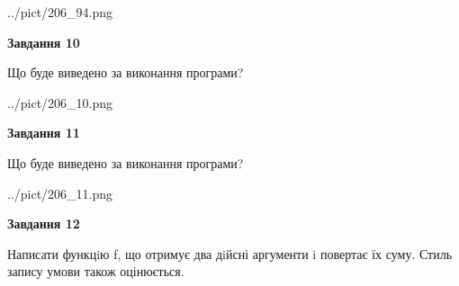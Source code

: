 \documentclass[12pt, ukrainian]{article}
\begin{document}
{\begin {large}
\begin{center}
	{../pict/206_94.png}
\end{center}
\newpage

{\begin {center}\textbf{Завдання 10}\end {center}}

Що буде виведено за виконання програми?\par
\begin{center}
	{../pict/206_10.png}
\end{center}
\newpage

{\begin {center}\textbf{Завдання 11}\end {center}}

Що буде виведено за виконання програми?\par
\begin{center}
	{../pict/206_11.png}
\end{center}
\newpage

{\begin {center}\textbf{Завдання 12}\end {center}}


Написати функцiю f, що отримує два дiйсні аргументи i повертає їх суму. Стиль запису умови також оцінюється.\par
\newpage

\end {large}}
\end{document}

